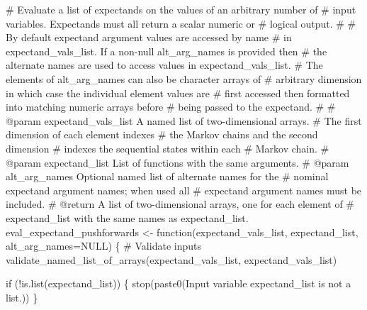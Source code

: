\documentclass[
  letterpaper,
  DIV=11,
  numbers=noendperiod]{scrartcl}
\newenvironment{Shaded}{\begin{snugshade}}{\end{snugshade}}
\newcommand{\BuiltInTok}[1]{\textcolor[rgb]{0.00,0.23,0.31}{#1}}
\newcommand{\CommentTok}[1]{\textcolor[rgb]{0.37,0.37,0.37}{#1}}
\newcommand{\ControlFlowTok}[1]{\textcolor[rgb]{0.00,0.23,0.31}{#1}}
\newcommand{\KeywordTok}[1]{\textcolor[rgb]{0.00,0.23,0.31}{#1}}
\newcommand{\NormalTok}[1]{\textcolor[rgb]{0.00,0.23,0.31}{#1}}
\newcommand{\OperatorTok}[1]{\textcolor[rgb]{0.37,0.37,0.37}{#1}}
\newcommand{\StringTok}[1]{\textcolor[rgb]{0.13,0.47,0.30}{#1}}
\begin{document}
\begin{Shaded}
\begin{Highlighting}[]
\CommentTok{\# Evaluate a list of expectands on the values of an arbitrary number of}
\CommentTok{\# input variables.  Expectands must all return a scalar numeric or}
\CommentTok{\# logical output.}
\CommentTok{\#}
\CommentTok{\# By default expectand argument values are accessed by name}
\CommentTok{\# in expectand\_vals\_list.  If a non{-}null alt\_arg\_names is provided then}
\CommentTok{\# the alternate names are used to access values in expectand\_vals\_list.}
\CommentTok{\# The elements of alt\_arg\_names can also be character arrays of}
\CommentTok{\# arbitrary dimension in which case the individual element values are}
\CommentTok{\# first accessed then formatted into matching numeric arrays before}
\CommentTok{\# being passed to the expectand.}
\CommentTok{\#}
\CommentTok{\# @param expectand\_vals\_list A named list of two{-}dimensional arrays.}
\CommentTok{\#                            The first dimension of each element indexes}
\CommentTok{\#                            the Markov chains and the second dimension}
\CommentTok{\#                            indexes the sequential states within each}
\CommentTok{\#                            Markov chain.}
\CommentTok{\# @param expectand\_list List of functions with the same arguments.}
\CommentTok{\# @param alt\_arg\_names Optional named list of alternate names for the}
\CommentTok{\#                      nominal expectand argument names; when used all}
\CommentTok{\#                      expectand argument names must be included.}
\CommentTok{\# @return A list of two{-}dimensional arrays, one for each element of}
\CommentTok{\#         expectand\_list with the same names as expectand\_list.}
\NormalTok{eval\_expectand\_pushforwards }\OperatorTok{\textless{}{-}}\NormalTok{ function(expectand\_vals\_list,}
\NormalTok{                                        expectand\_list,}
\NormalTok{                                        alt\_arg\_names}\OperatorTok{=}\NormalTok{NULL) \{}
  \CommentTok{\# Validate inputs}
\NormalTok{  validate\_named\_list\_of\_arrays(expectand\_vals\_list,}
                                \StringTok{\textquotesingle{}expectand\_vals\_list\textquotesingle{}}\NormalTok{)}

  \ControlFlowTok{if}\NormalTok{ (}\OperatorTok{!}\KeywordTok{is}\NormalTok{.}\BuiltInTok{list}\NormalTok{(expectand\_list)) \{}
\NormalTok{    stop(paste0(}\StringTok{\textquotesingle{}Input variable \textasciigrave{}expectand\_list\textasciigrave{} is not a list.\textquotesingle{}}\NormalTok{))}
\NormalTok{  \}}



\end{Highlighting}
\end{Shaded}
\end{document}
